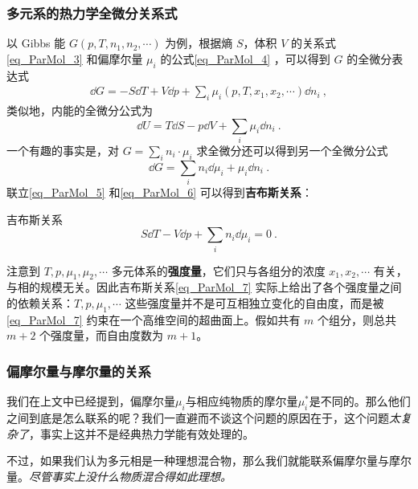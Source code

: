 \subsubsection{多元系的热力学全微分关系式}
以 Gibbs 能 $G(p,T,n_1,n_2,\cdots)$ 为例，根据熵 $S$，体积 $V$ 的关系式\autoref{eq_ParMol_3} 和偏摩尔量 $\mu_i$ 的公式\autoref{eq_ParMol_4} ，可以得到 $G$ 的全微分表达式
\begin{equation}\label{eq_ParMol_5}
\begin{aligned}
\dd G=-S\dd T+V\dd p+\sum_i \mu_i(p,T,x_1,x_2,\cdots) \dd n_i~,
\end{aligned}
\end{equation}
类似地，内能的全微分公式为
\begin{equation}
\dd U=T\dd S-p\dd V+\sum_i \mu_i\dd n_i~.
\end{equation}
一个有趣的事实是，对 $G=\sum_i n_i\cdot \mu_i$ 求全微分还可以得到另一个全微分公式
\begin{equation}\label{eq_ParMol_6}
\dd G=\sum_i n_i \dd \mu_i + \mu_i \dd n_i~.
\end{equation}
联立\autoref{eq_ParMol_5} 和\autoref{eq_ParMol_6} 可以得到\textbf{吉布斯关系}：
\begin{theorem}{吉布斯关系}
\begin{equation}\label{eq_ParMol_7}
S\dd T-V\dd p+\sum_i n_i\dd \mu_i=0~.
\end{equation}
\end{theorem}
注意到 $T,p,\mu_1,\mu_2,\cdots$ 多元体系的\textbf{强度量}，它们只与各组分的浓度 $x_1,x_2,\cdots $ 有关，与相的规模无关。因此吉布斯关系\autoref{eq_ParMol_7} 实际上给出了各个强度量之间的依赖关系：$T,p,\mu_1,\cdots$ 这些强度量并不是可互相独立变化的自由度，而是被\autoref{eq_ParMol_7} 约束在一个高维空间的超曲面上。假如共有 $m$ 个组分，则总共 $m+2$ 个强度量，而自由度数为 $m+1$。

\subsubsection{偏摩尔量与摩尔量的关系}
我们在上文中已经提到，偏摩尔量$\mu_i$与相应纯物质的摩尔量$\mu_i^*$是不同的。那么他们之间到底是怎么联系的呢？我们一直避而不谈这个问题的原因在于，这个问题\textsl{太复杂了}，事实上这并不是经典热力学能有效处理的。

不过，如果我们认为多元相是一种理想混合物，那么我们就能联系偏摩尔量与摩尔量。\textsl{尽管事实上没什么物质混合得如此理想。}
